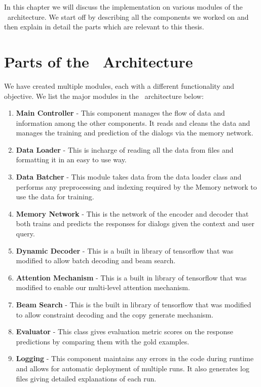 In this chapter we will discuss the implementation on various modules of the \sys\ architecture. We start off by describing all the components we worked on and then explain in detail the parts which are relevant to this thesis.

\section{Parts of the \sys\ Architecture}

We have created multiple modules, each with a different functionality and objective. We list the major modules in the \sys\ architecture below:

\begin{enumerate}
	\item \textbf{Main Controller} - This component manages the flow of data and information among the other components. It reads and cleans the data and manages the training and prediction of the dialogs via the memory network.
	\item \textbf{Data Loader} - This is incharge of reading all the data from files and formatting it in an easy to use way.
	\item \textbf{Data Batcher} - This module takes data from the data loader class and performs any preprocessing and indexing required by the Memory network to use the data for training.
	\item \textbf{Memory Network} - This is the network of the encoder and decoder that both trains and predicts the responses for dialogs given the context and user query.
	\item \textbf{Dynamic Decoder} - This is a built in library of tensorflow that was modified to allow batch decoding and beam search.
	\item \textbf{Attention Mechanism} - This is a built in library of tensorflow that was modified to enable our multi-level attention mechanism.
	\item \textbf{Beam Search} - This is the built in library of tensorflow that was modified to allow constraint decoding and the copy generate mechanism.
	\item \textbf{Evaluator} - This class gives evaluation metric scores on the response predictions by comparing them with the gold examples.
	\item \textbf{Logging} - This component maintains any errors in the code during runtime and allows for automatic deployment of multiple runs. It also generates log files giving detailed explanations of each run.
\end{enumerate}

